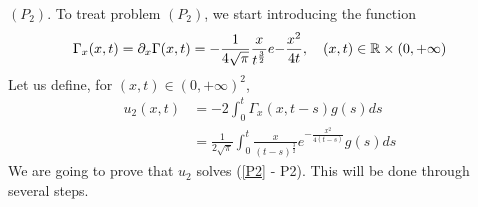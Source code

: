\begin{ProofBox}
    $(P_2)$. To treat problem $(P_2)$, we start introducing the function
\begin{equation*}
    \Gamma_x(x,t) = \partial_x \Gamma(x,t) = -\frac{1}{4 \sqrt{\pi}} \frac{x}{t^\frac{3}{2}} e{- \frac{x^2}{4t}}, \quad (x,t) \in \mathbb{R} \times (0,+\infty)
\end{equation*}
Let us define, for $(x,t) \in (0,+\infty)^2$,
\begin{align*}
    u_2(x,t) &= -2 \int_0^t \Gamma_x(x,t-s) g(s) ds \\
    &= \frac{1}{2 \sqrt{\pi}} \int_0^t \frac{x}{(t-s)^\frac{3}{2}} e^{-\frac{x^2}{4 (t-s)}}g(s) ds 
\end{align*}
We are going to prove that $u_2$ solves (\ref{P2} - P2). This will be done through several steps.
\end{ProofBox}
